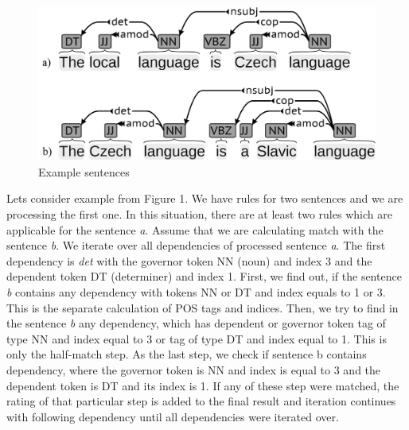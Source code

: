 \documentclass{iitsrc}
\begin{document}
		\begin{figure}[h]
			\begin{center}
				\includegraphics[scale=0.2]{sentences_bw}
				\caption{Example sentences}
				\label{fig:sentences}
			\end{center}
		\end{figure}
		
		Lets consider example from Figure 1. We have rules for two sentences and we are processing the first one. In this situation, there are at least two rules which are applicable for the sentence \textit{a}. Assume that we are calculating match with the sentence \textit{b}. We iterate over all dependencies of processed sentence \textit{a}. The first dependency is \textit{det} with the governor token NN (noun) and index 3 and the dependent token DT (determiner) and index 1. First, we find out, if the sentence \textit{b} contains any dependency with tokens NN or DT and index equals to 1 or 3. This is the separate calculation of POS tags and indices. Then, we try to find in the sentence \textit{b} any dependency, which has dependent or governor token tag of type NN and index equal to 3 or tag of type DT and index equal to 1. This is only the half-match step. As the last step, we check if sentence b contains dependency, where the governor token is NN and index is equal to 3 and the dependent token is DT and its index is 1. If any of these step were matched, the rating of that particular step is added to the final result and iteration continues with following dependency until all dependencies were iterated over.
\end{document}

